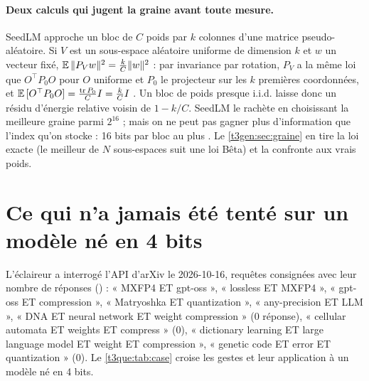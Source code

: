 \paragraph{Deux calculs qui jugent la graine avant toute mesure.} SeedLM approche un bloc de $C$ poids par $k$ colonnes d'une matrice pseudo-aléatoire. Si $V$ est un sous-espace aléatoire uniforme de dimension $k$ et $w$ un vecteur fixé, $\mathbb{E}\,\|P_V w\|^2 = \frac{k}{C}\|w\|^2$ : par invariance par rotation, $P_V$ a la même loi que $O^\top P_0 O$ pour $O$ uniforme et $P_0$ le projecteur sur les $k$ premières coordonnées, et $\mathbb{E}\,[O^\top P_0 O] = \frac{\mathrm{tr}\,P_0}{C} I = \frac{k}{C} I$ \calc. Un bloc de poids presque i.i.d. laisse donc un résidu d'énergie relative voisin de $1 - k/C$. SeedLM le rachète en choisissant la meilleure graine parmi $2^{16}$ ; mais on ne peut pas gagner plus d'information que l'index qu'on stocke : 16 bits par bloc au plus \calc. Le \cref{t3gen:sec:graine} en tire la loi exacte (le meilleur de $N$ sous-espaces suit une loi Bêta) et la confronte aux vrais poids.

\section{Ce qui n'a jamais été tenté sur un modèle né en 4 bits}\label{t3que:sec:case}

L'éclaireur a interrogé l'API d'arXiv le 2026-10-16, requêtes consignées avec leur nombre de réponses () : « MXFP4 ET gpt-oss », « lossless ET MXFP4 », « gpt-oss ET compression », « Matryoshka ET quantization », « any-precision ET LLM », « DNA ET neural network ET weight compression » (0 réponse), « cellular automata ET weights ET compress » (0), « dictionary learning ET large language model ET weight ET compression », « genetic code ET error ET quantization » (0). Le \cref{t3que:tab:case} croise les gestes et leur application à un modèle né en 4 bits.

